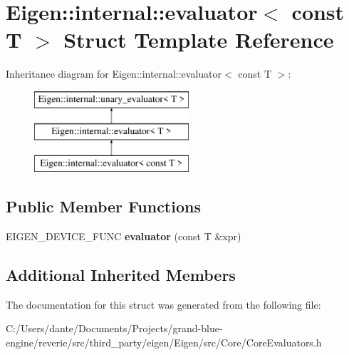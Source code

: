 \hypertarget{struct_eigen_1_1internal_1_1evaluator_3_01const_01_t_01_4}{}\section{Eigen\+::internal\+::evaluator$<$ const T $>$ Struct Template Reference}
\label{struct_eigen_1_1internal_1_1evaluator_3_01const_01_t_01_4}
Inheritance diagram for Eigen\+::internal\+::evaluator$<$ const T $>$\+:\begin{figure}[H]
\begin{center}
\leavevmode
\includegraphics[height=3.000000cm]{struct_eigen_1_1internal_1_1evaluator_3_01const_01_t_01_4}
\end{center}
\end{figure}
\subsection*{Public Member Functions}
\begin{DoxyCompactItemize}
\item 
\mbox{\label{struct_eigen_1_1internal_1_1evaluator_3_01const_01_t_01_4_ab7b217b5a318a376939af2b53fd2728b}} 
E\+I\+G\+E\+N\+\_\+\+D\+E\+V\+I\+C\+E\+\_\+\+F\+U\+NC {\bfseries evaluator} (const T \&xpr)
\end{DoxyCompactItemize}
\subsection*{Additional Inherited Members}


The documentation for this struct was generated from the following file\+:\begin{DoxyCompactItemize}
\item 
C\+:/\+Users/dante/\+Documents/\+Projects/grand-\/blue-\/engine/reverie/src/third\+\_\+party/eigen/\+Eigen/src/\+Core/Core\+Evaluators.\+h\end{DoxyCompactItemize}
